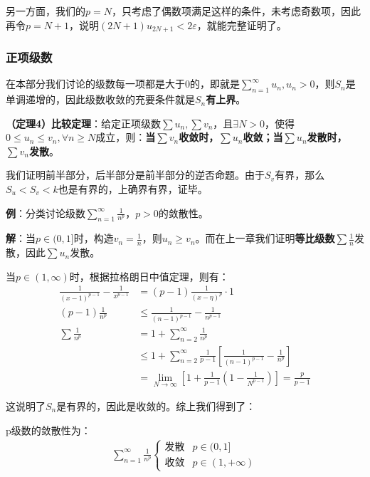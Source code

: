 \documentclass{ctexart}
\let\oldtextbf\textbf
\renewcommand{\textbf}[1]{\textcolor{brown!50!red}{\oldtextbf{#1}}}
\begin{document}
另一方面，我们的$p=N$，只考虑了偶数项满足这样的条件，未考虑奇数项，因此再令$p=N+1$，说明$(2N+1)u_{2N+1}<2\varepsilon$，就能完整证明了。

\subsubsection{正项级数}
在本部分我们讨论的级数每一项都是大于0的，即就是$\sum_{n=1}^\infty u_n,u_n>0$，则$S_n$是单调递增的，因此级数收敛的充要条件就是$S_n$\textbf{\color{brown!50!red}有上界}。
\begin{tcolorbox}[
    colback=bac2,     %
    colframe=fra2,   %
    coltitle=white,             %
    coltext=tex2,
    title=比较定理,
    fonttitle=\bfseries,        %
arc=3mm,                     %
breakable
]
\textbf{\color{brown!50!red}（定理4）比较定理}：给定正项级数$\sum u_n,\sum v_n$，且$\exists N>0$，使得$0\leq u_n\leq v_n,\forall n\geq N$成立，则：\textbf{\color{brown!50!red}当$\sum v_n$收敛时，$\sum u_n$收敛；当$\sum u_n$发散时，$\sum v_n$发散}。
\end{tcolorbox}

我们证明前半部分，后半部分是前半部分的逆否命题。由于$S_v$有界，那么$S_u<S_v<k$也是有界的，上确界有界，证毕。

\textbf{\color{brown!50!red}例}：分类讨论级数$\sum_{n=1}^\infty \frac{1}{n^p}，p>0$的敛散性。

\textbf{\color{brown!50!red}解}：当$p\in(0,1]$时，构造$v_n=\frac{1}{n}$，则$u_n\geq v_n$。而在上一章我们证明\textbf{\color{brown!50!red}等比级数}$\sum \frac{1}{n}$发散，因此$\sum u_n$发散。

当$p\in(1,\infty)$时，根据拉格朗日中值定理，则有：
\begin{align*}
     \frac{1}{(x-1)^{p-1}}-\frac{1}{x^{p-1}}&=(p-1)\frac{1}{(x-\eta)^{p}}\cdot1 \\
(p-1)\frac{1}{n^p}&\leq\frac{1}{(n-1)^{p-1}}-\frac{1}{n^{p-1}} \\
\sum\frac{1}{n^p}&=1+\sum_{n=2}^\infty \frac{1}{n^p}\\
&\leq 1+\sum_{n=2}^\infty
\frac{1}{p-1} [\frac{1}{(n-1)^{p-1}}-\frac{1}{n^p}]   \\
&=\lim_{N\to\infty}[1+\frac{1}{p-1}(1-\frac{1}{N^{p-1}})]=\frac{p}{p-1}         
\end{align*}

这说明了$S_n$是有界的，因此是收敛的。综上我们得到了：
\begin{tcolorbox}[
    colback=bac1,     %
    colframe=fra1,   %
    coltitle=white,             %
    coltext=tex1,
    title=p级数的收敛条件,
    fonttitle=\bfseries,        %
arc=3mm,                     %
breakable
]
p级数的敛散性为：
\begin{align*}
   \sum_{n=1}^\infty \frac{1}{n^p}\begin{cases}
\text{发散}&p\in (0,1]\\
\text{收敛}&p\in (1,+\infty)
\end{cases} 
\end{align*}
\end{tcolorbox}
\end{document}

